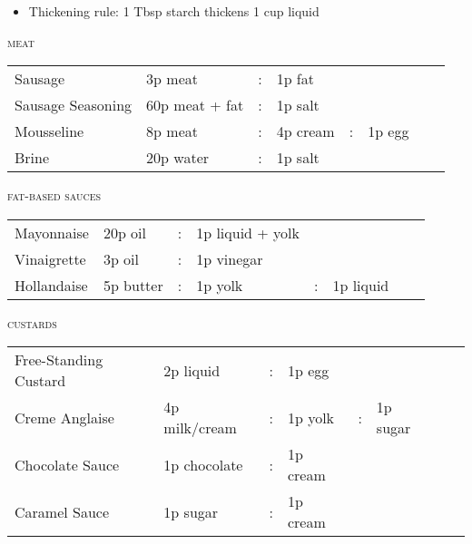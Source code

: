 \documentclass[letterpaper,11pt]{article}
\newcommand{\sectionheader}[1]{
    \vspace{0.5em}
    {\small\textsc{#1}} \\
    \vspace{1em}
}
\begin{document}
{ \small
\begin{itemize}[topsep=4pt]
  \item Thickening rule: 1 Tbsp starch thickens 1 cup liquid
\end{itemize}
}

\sectionheader{meat}
{ \small
\begin{tabularx}{\textwidth}{ p{4cm} X c X c X c X }
Sausage & 3p meat & : & 1p fat & & & & \\
Sausage Seasoning & 60p meat + fat & : & 1p salt & & & & \\
Mousseline & 8p meat & : & 4p cream & : & 1p egg & & \\
Brine & 20p water & : & 1p salt & & & & \\
\end{tabularx}
}

\sectionheader{fat-based sauces}
{ \small
\begin{tabularx}{\textwidth}{ p{4cm} X c X c X c X }
Mayonnaise & 20p oil & : & 1p liquid +  yolk & & & & \\
Vinaigrette & 3p oil & : & 1p vinegar & & & & \\
Hollandaise & 5p butter & : & 1p yolk & : & 1p liquid & & \\
\end{tabularx}
}

\sectionheader{custards}
{ \small
\begin{tabularx}{\textwidth}{ p{4cm} X c X c X c X }
Free-Standing Custard & 2p liquid & : & 1p egg & & & & \\
Creme Anglaise & 4p milk/cream & : & 1p yolk & : & 1p sugar & & \\
Chocolate Sauce & 1p chocolate & : & 1p cream & & & & \\
Caramel Sauce & 1p sugar & : & 1p cream & & & & \\
\end{tabularx}
}
\end{document}
